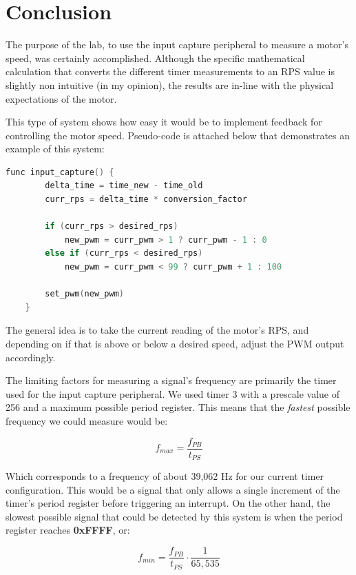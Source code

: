 \documentclass[a4paper, 12pt]{article}
\begin{document}
\section{Conclusion}
The purpose of the lab, to use the input capture peripheral to measure a motor's speed, was certainly accomplished. Although the specific mathematical calculation that converts the different timer measurements to an RPS value is slightly non intuitive (in my opinion), the results are in-line with the physical expectations of the motor.

This type of system shows how easy it would be to implement feedback for controlling the motor speed. Pseudo-code is attached below that demonstrates an example of this system:
\newpage
	\begin{mdframed}[backgroundcolor=code-gray, roundcorner=10pt,
								innerleftmargin=5, innertopmargin=5, innerbottommargin=5]	
	\begin{lstlisting}[language=C, caption=Feedback Pseudo-Code, tabsize=2, label={lst:feedback}]
	func input_capture() {
		delta_time = time_new - time_old
		curr_rps = delta_time * conversion_factor

		if (curr_rps > desired_rps)
			new_pwm = curr_pwm > 1 ? curr_pwm - 1 : 0
		else if (curr_rps < desired_rps)
			new_pwm = curr_pwm < 99 ? curr_pwm + 1 : 100

		set_pwm(new_pwm)
	}
	\end{lstlisting}
	\end{mdframed}
	
The general idea is to take the current reading of the motor's RPS, and depending on if that is above or below a desired speed, adjust the PWM output accordingly.

The limiting factors for measuring a signal's frequency are primarily the timer used for the input capture peripheral. We used timer 3 with a prescale value of 256 and a maximum possible period register. This means that the \textit{fastest} possible frequency we could measure would be:

$$f_{max}=\frac{f_{PB}}{t_{PS}}$$

Which corresponds to a frequency of about 39,062 Hz for our current timer configuration. This would be a signal that only allows a single increment of the timer's period register before triggering an interrupt. On the other hand, the slowest possible signal that could be detected by this system is when the period register reaches \textbf{0xFFFF}, or:

$$f_{min}=\frac{f_{PB}}{t_{PS}}\cdot\frac{1}{65,535}$$
\end{document}
